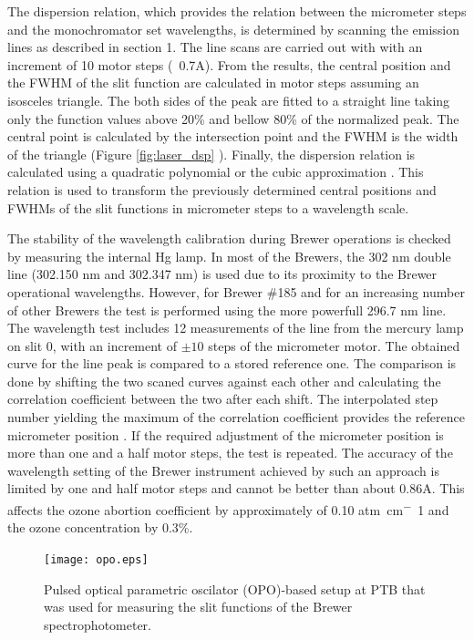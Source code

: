 \documentclass[acp, manuscript]{copernicus}
\begin{document}
The dispersion relation, which provides the  relation between the micrometer steps and the monochromator set wavelengths, is determined by scanning the emission lines as described in section 1. The line scans are carried out with with an increment of 10 motor steps (~0.7A). From the results, the central position and the FWHM of the slit function are calculated in  motor steps assuming an isosceles triangle. The both sides of the peak are  fitted to a straight line taking only the function values above 20\%  and bellow 80\% of the normalized peak. The central point is calculated by the intersection point and the FWHM is the width of the triangle (Figure \ref{fig:laser_dsp} ). Finally, the dispersion relation is calculated using a quadratic polynomial or the cubic approximation \citep{Grobner1998}. This relation is used to transform the previously determined central positions and FWHMs of the slit functions in micrometer steps to a wavelength scale.


   The stability of the wavelength calibration during Brewer operations is checked by measuring the internal Hg lamp. In most of the Brewers, the 302 \unit{nm} double line (302.150 nm and 302.347 nm) is used due to its proximity to the Brewer operational wavelengths. However, for Brewer \#185 and for an increasing number of other Brewers the test is  performed using the more powerfull 296.7 \unit{nm} line. The wavelength test includes 12 measurements of the line from the mercury lamp on slit 0, with an increment of  $\pm10$ steps of the micrometer motor. The obtained curve for the line peak is compared to a stored reference one. The comparison is done by shifting the two scaned curves against each other and calculating the correlation coefficient between the two after each shift. The interpolated step number yielding the maximum of the correlation coefficient provides the reference micrometer position \citep{savastiouk2005improvements}. If the required adjustment of the micrometer position is more than one and a half motor steps, the test is repeated. The accuracy of the wavelength setting of the Brewer instrument achieved by such an approach is limited by one and half motor steps and cannot be better than about 0.86A. This affects the ozone abortion coefficient by approximately of 0.10 \unit{atm cm^-1} and the ozone concentration by 0.3\%.
  


\begin{figure}[t]
\texttt{[image: opo.eps]}
\caption{Pulsed optical parametric oscilator (OPO)-based setup at PTB that was used for measuring the slit functions of the Brewer spectrophotometer.}
\label{fig:opo}
\end{figure}
\end{document}
